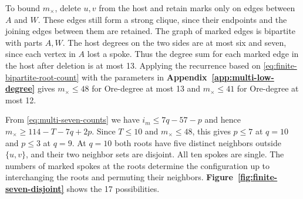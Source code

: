 \documentclass[preprint,11pt,numbers]{elsarticle-arxiv}
\numberwithin{equation}{section}
\theoremstyle{definition}
\begin{document}
To bound $m_\times$, delete $u,v$ from the host and retain
marks only on edges between $A$ and $W$. These edges still form
a strong clique, since their endpoints and the joining edges
between them are retained. The graph of marked edges is
bipartite with parts $A,W$. The host degrees on the two sides
are at most six and seven, since each vertex in $A$ lost a
spoke. Thus the degree sum for each marked edge in the host
after deletion is at most 13.
Applying the recurrence based on \eqref{eq:finite-bipartite-root-count}
with the parameters in \textbf{Appendix~\ref{app:multi-low-degree}}
gives $m_\times\leq48$ for Ore-degree at most 13 and
$m_\times\leq41$ for Ore-degree at most 12.

From \eqref{eq:multi-seven-counts} we have $i_m\leq7q-57-p$ and hence
$m_\times\geq114-T-7q+2p$. Since $T\leq10$ and $m_\times\leq48$, this
gives $p\le7$ at $q=10$ and $p\le3$ at $q=9$. At $q=10$ both roots
have five distinct neighbors outside $\{u,v\}$, and their two neighbor
sets are disjoint. All ten spokes are single. The numbers of marked
spokes at the roots determine the configuration up to interchanging
the roots and permuting their neighbors.
\textbf{Figure~\ref{fig:finite-seven-disjoint}} shows the 17 possibilities.
\end{document}
